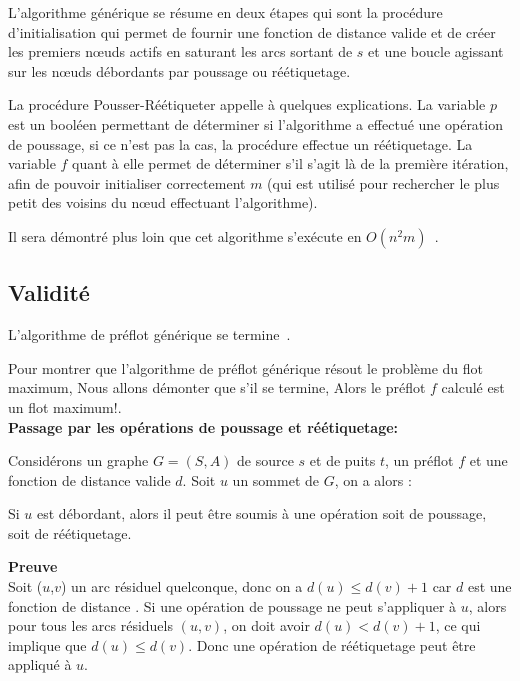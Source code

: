 L'algorithme générique se résume en deux étapes qui sont la procédure d'initialisation qui permet de
fournir une fonction de distance valide et de créer les premiers n\oe uds actifs en saturant les
arcs sortant de $s$ et une boucle agissant sur les n\oe uds débordants par poussage ou réétiquetage.




La procédure Pousser-Réétiqueter appelle à quelques explications. La variable $p$ est un booléen
permettant de déterminer si l'algorithme a effectué une opération de poussage, si ce n'est pas la
cas, la procédure effectue un réétiquetage. La variable $f$ quant à elle permet de déterminer s'il
s'agit là de la première itération, afin de pouvoir initialiser correctement $m$ (qui est utilisé
pour rechercher le plus petit des voisins du n\oe ud effectuant l'algorithme).



Il sera démontré plus loin que cet algorithme s'exécute en $O(n^2m)$~\cite{gold88}.

\subsection{Validité}

\begin{thrm}
	L'algorithme de préflot générique se termine~\cite{introalg}.
\end{thrm}

Pour montrer que l'algorithme de préflot générique résout le problème du flot maximum, Nous allons démonter que s'il se termine, Alors le préflot $f$ calculé est un flot maximum!.\\

\textbf{Passage par les opérations de poussage et réétiquetage:}  

Considérons un graphe $G = (S,A)$ de source $s$ et de puits $t$, un préflot $f$ et une fonction de
distance valide $d$. Soit $u$ un sommet de $G$, on a alors :

\begin{lemma}
	\label{increase_distance}
  Si $u$ est débordant, alors il peut être soumis à une opération soit de poussage, soit de
	réétiquetage.  
\end{lemma}   
\textbf{Preuve} \\
Soit ($u$,$v$) un arc résiduel quelconque, donc on a $d(u)\leq d(v)+1$ car $d$ est une fonction  de
distance . Si une opération de poussage ne peut s'appliquer à $u$, alors pour tous les arcs
résiduels $(u,v)$, on doit avoir $d(u)< d(v)+1$, ce qui implique que $d(u)\leq d(v)$. Donc une
opération de réétiquetage peut être appliqué à $u$.\\

